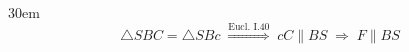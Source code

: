 \documentclass[border=4pt]{standalone}
\begin{document}
\begin{varwidth}{30em}
\large
\[ \triangle SBC = \triangle SBc \;\overset{\text{Eucl. I.40}}{\Longrightarrow}\; cC \parallel BS \;\Rightarrow\; F \parallel BS \]

\end{varwidth}
\end{document}
